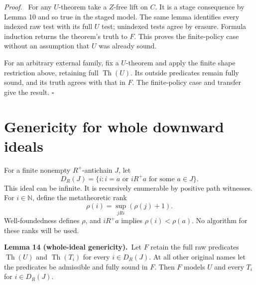 \documentclass[11pt]{article}
\newcommand{\N}{\mathbb N}
\newcommand{\Th}{\operatorname{Th}}
\newcommand{\qed}{\hfill\ensuremath{\square}}
\newenvironment{proof}{\par\emph{Proof.}\ }{\qed\par}
\newcommand{\statement}[2]{\par\textbf{#1.}\ #2\par}
\begin{document}
\begin{proof}
For any $U$-theorem take a $Z$-free lift on $C$. It is a stage
consequence by Lemma 10 and so true in the staged model. The same
lemma identifies every indexed raw test with its full $U$ test;
unindexed tests agree by erasure. Formula induction returns the
theorem's truth to $F$. This proves the finite-policy case without
an assumption that $U$ was already sound.

For an arbitrary external family, fix a $U$-theorem and apply the
finite shape restriction above, retaining full $\Th(U)$. Its outside
predicates remain fully sound, and its truth agrees with that in
$F$. The finite-policy case and transfer give the result.
\end{proof}

\section{Genericity for whole downward ideals}\label{sec:ideals}

For a finite nonempty $R^+$-antichain $J$, let
\[
 D_R(J)=\{i:i=a\text{ or }iR^+a\text{ for some }a\in J\}.
\]
This ideal can be infinite. It is recursively enumerable by positive
path witnesses. For $i\in\N$, define the metatheoretic rank
\begin{equation}\label{eq:rho}
 \rho(i)=\sup_{jRi}(\rho(j)+1).
\end{equation}
Well-foundedness defines $\rho$, and $iR^+a$ implies $\rho(i)<\rho(a)$.
No algorithm for these ranks will be used.

\statement{Lemma 14 (whole-ideal genericity)}{Let $F$ retain the full
raw predicates $\Th(U)$ and $\Th(T_i)$ for every $i\in D_R(J)$.
At all other original names let the predicates be admissible and
fully sound in $F$. Then $F$ models $U$ and every $T_i$ for
$i\in D_R(J)$.}
\end{document}
